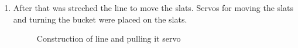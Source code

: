 \begin{enumerate}
  \item After that was streched the line to move the slats. Servos for moving the slats and turning the bucket were placed on the slats.
  \begin{figure}[h]
  	\begin{minipage}[h]{0.47\linewidth}
  		\caption{Construction of line and pulling it servo}
  	\end{minipage}
  	\hfill
  	\begin{minipage}[h]{0.47\linewidth}

\end{minipage}
\end{figure}
\end{enumerate}
